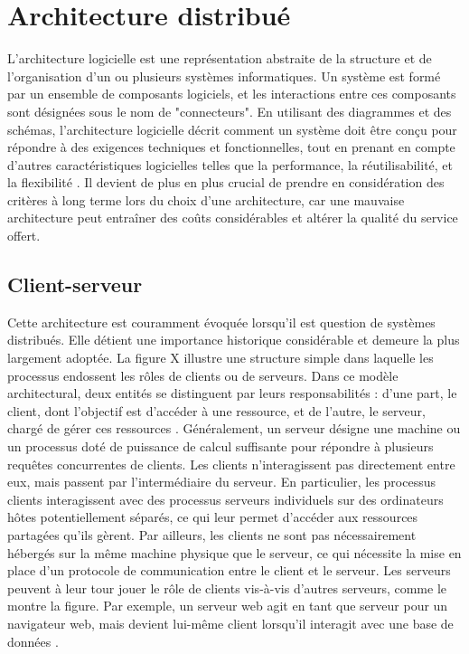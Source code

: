\section{Architecture distribué}

L'architecture logicielle est une représentation abstraite de la structure et de l'organisation d'un ou plusieurs systèmes informatiques. Un système est formé par un ensemble de composants logiciels, et les interactions entre ces composants sont désignées sous le nom de "connecteurs". En utilisant des diagrammes et des schémas, l'architecture logicielle décrit comment un système doit être conçu pour répondre à des exigences techniques et fonctionnelles, tout en prenant en compte d'autres caractéristiques logicielles telles que la performance, la réutilisabilité, et la flexibilité \cite{Martens_2010}. Il devient de plus en plus crucial de prendre en considération des critères à long terme lors du choix d'une architecture, car une mauvaise architecture peut entraîner des coûts considérables et altérer la qualité du service offert. \cite{Kolny_2023}

\subsection{Client-serveur}

Cette architecture est couramment évoquée lorsqu'il est question de systèmes distribués. Elle détient une importance historique considérable et demeure la plus largement adoptée. La figure X illustre une structure simple dans laquelle les processus endossent les rôles de clients ou de serveurs. Dans ce modèle architectural, deux entités se distinguent par leurs responsabilités : d'une part, le client, dont l'objectif est d'accéder à une ressource, et de l'autre, le serveur, chargé de gérer ces ressources \cite{Terra_2023}. Généralement, un serveur désigne une machine ou un processus doté de puissance de calcul suffisante pour répondre à plusieurs requêtes concurrentes de clients. Les clients n'interagissent pas directement entre eux, mais passent par l'intermédiaire du serveur. En particulier, les processus clients interagissent avec des processus serveurs individuels sur des ordinateurs hôtes potentiellement séparés, ce qui leur permet d'accéder aux ressources partagées qu'ils gèrent. Par ailleurs, les clients ne sont pas nécessairement hébergés sur la même machine physique que le serveur, ce qui nécessite la mise en place d'un protocole de communication entre le client et le serveur. Les serveurs peuvent à leur tour jouer le rôle de clients vis-à-vis d'autres serveurs, comme le montre la figure. Par exemple, un serveur web agit en tant que serveur pour un navigateur web, mais devient lui-même client lorsqu'il interagit avec une base de données \cite{Coulouris_2012}.

